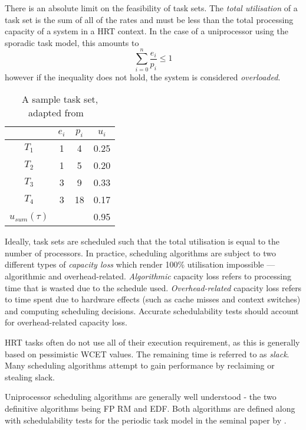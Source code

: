 There is an absolute limit on the feasibility of task sets.
The \emph{total utilisation} of a task set is the sum of all of the rates and must be less than the total processing capacity of a system in a \gls{HRT} context.
In the case of a uniprocessor using the sporadic task model, this amounts to
\begin{equation*}
	\sum\limits_{i=0}^n \dfrac{e_{i}}{p_{i}} \leq 1
\end{equation*}
however if the inequality does not hold, the system is considered \emph{overloaded}.

\begin{table}
    \centering
    \begin{tabular}{cccc} \toprule
        & \emph{$e_{i}$} & $p_{i}$ & $u_{i} $ \\ \midrule
			$ T_{1}$ & 1 & 4 & 0.25 \\
			$ T_{2}$ & 1 & 5 & 0.20 \\
			$ T_{3}$ & 3 & 9 & 0.33 \\
			$ T_{4}$ & 3 & 18 & 0.17  \\\midrule 
	$ u_{sum}(\tau)$ & &  & 0.95 \\ \bottomrule
	\end{tabular}
	\caption{A sample task set, adapted from ~\citep{Brandenburg:phd}}
	\label{tab:example_task_set}
\end{table}

Ideally, task sets are scheduled such that the total utilisation is equal to the number of processors.
In practice, scheduling algorithms are subject to two different types of \emph{capacity loss} which render 100\% utilisation impossible --- algorithmic and overhead-related.
\emph{Algorithmic} capacity loss refers to processing time that is wasted due to the schedule used.
\emph{Overhead-related} capacity loss refers to time spent due to hardware effects (such as cache misses and context switches) and computing scheduling decisions.
Accurate schedulability tests should account for overhead-related capacity loss.

\gls{HRT} tasks often do not use all of their execution requirement, as this is generally based on pessimistic \gls{WCET} values.
The remaining time is referred to as \emph{slack}.
Many scheduling algorithms attempt to gain performance by reclaiming or stealing slack.


Uniprocessor scheduling algorithms are generally well understood - the two definitive algorithms being \acrlong{FP} \acrlong{RM} and \acrlong{EDF}.
Both algorithms are defined along with schedulability tests for the periodic task model in the seminal paper by \citet{Liu_Layland_73}.

